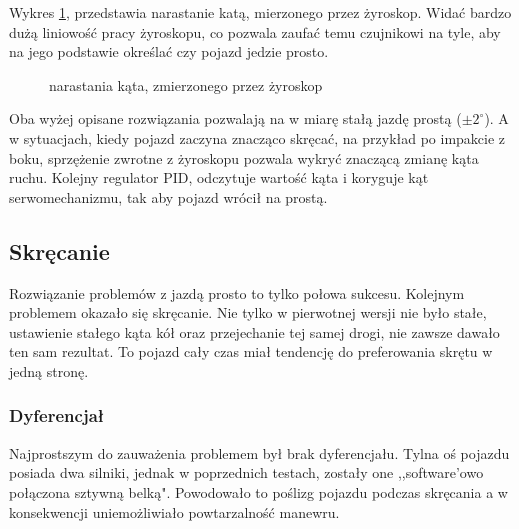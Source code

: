         Wykres \ref{plot:delta_angle_with_gyro}, przedstawia narastanie katą, mierzonego przez żyroskop.
        Widać bardzo dużą liniowość pracy żyroskopu, co pozwala zaufać temu czujnikowi na tyle, aby na jego podstawie określać czy pojazd jedzie prosto.

        \begin{figure}[!ht]
            \centering
                \renewcommand{\figurename}{Wykres}
                \caption{narastania kąta, zmierzonego przez żyroskop}
                \label{plot:delta_angle_with_gyro}
        \end{figure}


    \newpage
    Oba wyżej opisane rozwiązania pozwalają na w miarę stałą jazdę prostą ($\pm 2^\circ$).
    A w sytuacjach, kiedy pojazd zaczyna znacząco skręcać, na przykład po impakcie z boku, sprzężenie zwrotne z żyroskopu pozwala wykryć znaczącą zmianę kąta ruchu.
    Kolejny regulator PID, odczytuje wartość kąta i koryguje kąt serwomechanizmu, tak aby pojazd wrócił na prostą.

    \subsection{Skręcanie}
        Rozwiązanie problemów z jazdą prosto to tylko połowa sukcesu.
        Kolejnym problemem okazało się skręcanie. 
        Nie tylko w pierwotnej wersji nie było stałe, ustawienie stałego kąta kół oraz przejechanie tej samej drogi, nie zawsze dawało ten sam rezultat.
        To pojazd cały czas miał tendencję do preferowania skrętu w jedną stronę.
        
        \subsubsection{Dyferencjał}
        \label{subsubsec:dyferencjal}
        Najprostszym do zauważenia problemem był brak dyferencjału. 
        Tylna oś pojazdu posiada dwa silniki, jednak w poprzednich testach, zostały one ,,software'owo połączona sztywną belką".
        Powodowało to poślizg pojazdu podczas skręcania a w konsekwencji uniemożliwiało powtarzalność manewru.

